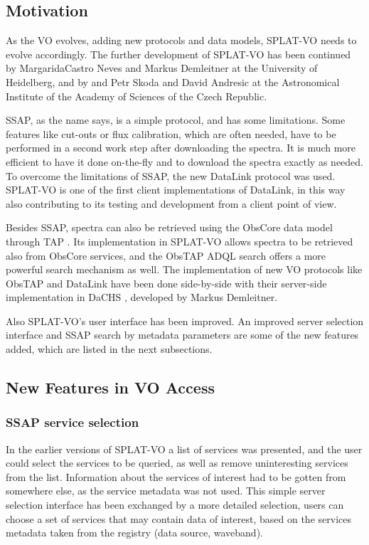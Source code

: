 \documentclass[final,authoryear,5p,times,twocolumn]{elsarticle}
\begin{document}
\subsection{Motivation}

As the VO evolves, adding new protocols and data models, SPLAT-VO
needs to evolve accordingly.  The further development of SPLAT-VO has
been continued by MargaridaCastro Neves and Markus Demleitner at the
University of Heidelberg, and by and Petr Skoda and David Andresic at
the Astronomical Institute of the Academy of Sciences of the Czech
Republic.

SSAP, as the name says, is a simple protocol, and has some
limitations. Some features like cut-outs or flux calibration, which
are often needed, have to be performed in a second work step after
downloading the spectra. It is much more efficient to have it done
on-the-fly and  to download the spectra exactly as needed. To overcome
the limitations of SSAP, the new DataLink protocol \citep{datalink}
was used. SPLAT-VO is one of the first client implementations of
DataLink, in this way also contributing to its testing and development
from a client point of view.

Besides SSAP, spectra can also be retrieved using the ObsCore data model
through TAP \citep[known as ObsTap;][]{obstap}. Its implementation in
SPLAT-VO allows spectra to be retrieved also from ObsCore services, and
the ObsTAP ADQL \citep{adql} search offers a more powerful search
mechanism as well. The implementation of new VO protocols like ObsTAP
and DataLink have been done side-by-side with their server-side
implementation in DaCHS \citep[Data Center Helper Suite;][]{dachs},
developed by Markus Demleitner.

Also SPLAT-VO's user interface has been improved. An improved server
selection interface and SSAP search by metadata parameters are some of
the new features added, which are listed in the next subsections.

\subsection{New Features in VO Access}

\subsubsection{SSAP service selection}

In the earlier versions of SPLAT-VO a list of services was presented, and
the user could select the services to be queried, as well as remove
uninteresting services from the list. Information about the services
of interest had to be gotten from somewhere else, as the service
metadata was not used.  This simple server selection interface has
been exchanged by a more detailed selection, users can choose a set of
services that may contain data of interest, based on the services
metadata taken from the registry (data source, waveband).
\end{document}
